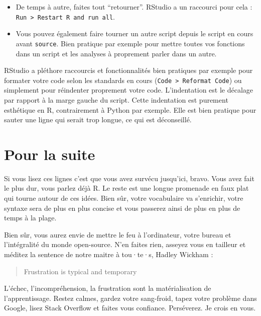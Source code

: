 \documentclass[
  letterpaper,
  DIV=11,
  numbers=noendperiod]{scrreprt}
\providecommand{\tightlist}{%
  \setlength{\itemsep}{0pt}\setlength{\parskip}{0pt}}\usepackage{longtable,booktabs,array}
\begin{document}
\begin{itemize}
\tightlist
\item
  De temps à autre, faites tout ``retourner''. RStudio a un raccourci
  pour cela : \texttt{Run\ \textgreater{}\ Restart\ R\ and\ run\ all}.
\item
  Vous pouvez également faire tourner un autre script depuis le script
  en cours avant \texttt{source}. Bien pratique par exemple pour mettre
  toutes vos fonctions dans un script et les analyses à proprement
  parler dans un autre.
\end{itemize}

RStudio a pléthore raccourcis et fonctionnalités bien pratiques par
exemple pour formater votre code selon les standards en cours
(\texttt{Code\ \textgreater{}\ Reformat\ Code}) ou simplement pour
réindenter proprement votre code. L'indentation est le décalage par
rapport à la marge gauche du script. Cette indentation est purement
esthétique en R, contrairement à Python par exemple. Elle est bien
pratique pour sauter une ligne qui serait trop longue, ce qui est
déconseillé.

\hypertarget{pour-la-suite}{%
\section{Pour la suite}\label{pour-la-suite}}

Si vous lisez ces lignes c'est que vous avez survécu jusqu'ici, bravo.
Vous avez fait le plus dur, vous parlez déjà R. Le reste est une longue
promenade en faux plat qui tourne autour de ces idées. Bien sûr, votre
vocabulaire va s'enrichir, votre syntaxe sera de plus en plus concise et
vous passerez ainsi de plus en plus de temps à la plage.

Bien sûr, vous aurez envie de mettre le feu à l'ordinateur, votre bureau
et l'intégralité du monde open-source. N'en faites rien, asseyez vous en
tailleur et méditez la sentence de notre maitre à tou·te·s, Hadley
Wickham :

\begin{quote}
Frustration is typical and temporary
\end{quote}

L'échec, l'incompréhension, la frustration sont la matérialisation de
l'apprentissage. Restez calmes, gardez votre sang-froid, tapez votre
problème dans Google, lisez Stack Overflow et faites vous confiance.
Perséverez. Je crois en vous.

\end{document}
